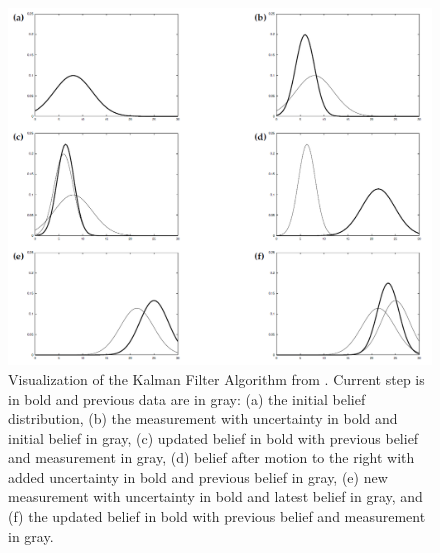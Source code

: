 \documentclass[twoside]{article}
\begin{document}
\begin{figure}[tp]
\centering
\includegraphics[width=1\linewidth]{KF_algorithm.png}
\caption{Visualization of the Kalman Filter Algorithm from \cite{thrun2005probabilistic}. Current step is in bold and previous data are in gray: (a) the initial belief distribution, (b) the measurement with uncertainty in bold and initial belief in gray, (c) updated belief in bold with previous belief and measurement in gray, (d) belief after motion to the right with added uncertainty in bold and previous belief in gray, (e) new measurement with uncertainty in bold and latest belief in gray, and (f) the updated belief in bold with previous belief and measurement in gray.}
\label{fig:KF_algorithm}
\end{figure}
\end{document}
